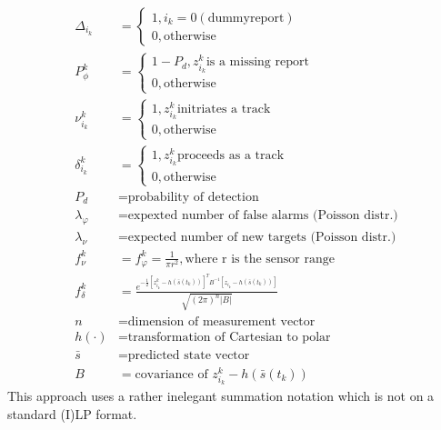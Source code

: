 \begin{equation*}
\begin{split}
	\Delta_{i_k} 	&= 
		\begin{cases} 
			1, i_k=0 (\text{dummyreport}) \\ 
			0, \text{otherwise} 
		\end{cases} \\
	P_\phi^k 		&=
		\begin{cases} 
			1-P_d, z_{i_k}^k \text{is a missing report} \\ 
			0, \text{otherwise} 
		\end{cases} \\
	\nu_{i_k}^k 	&=
		\begin{cases} 
			1, z_{i_k}^k \text{initriates a track} \\ 
			0, \text{otherwise} 
		\end{cases} \\
	\delta_{i_k}^k 	&=
		\begin{cases} 
			1, z_{i_k}^k \text{proceeds as a track} \\ 
			0, \text{otherwise} 
		\end{cases} \\
	P_d 			&= \text{probability of detection} \\
	\lambda_\varphi &= \text{expexted number of false alarms (Poisson distr.)} \\
	\lambda_\nu		&= \text{expected number of new targets (Poisson distr.)} \\
	f_\nu^k 		&= f_\varphi^k = \frac{1}{\pi r^2}, \text{where r is the sensor range} \\
	f_\delta^k 		&= \frac{e^{-\frac{1}{2}[z_{i_k}^k-h(\bar{s}(t_k))]^T B^{-1} [z_{i_k}-h(\bar{s}(t_k))] }}{\sqrt{(2\pi)^n |B|}} \\
	n 				&= \text{dimension of measurement vector} \\
	h(\cdot)		&= \text{transformation of Cartesian to polar} \\
	\bar{s}			&= \text{predicted state vector} \\
	B 				&= \text{covariance of } z_{i_k}^k - h(\bar{s}(t_k))
\end{split}
\end{equation*}
This approach uses a rather inelegant summation notation which is not on a standard (I)LP format. 

